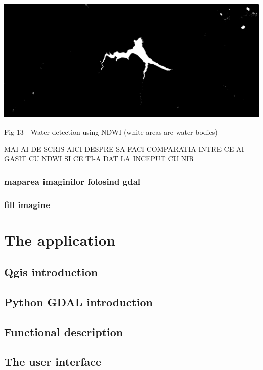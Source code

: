 \documentclass[12pt, a4paper]{report}
\begin{document}
\includegraphics[scale=0.35, left]{NDWI-prediction.png}
\begin{center}
Fig 13 - Water detection using NDWI (white areas are water bodies)
\end{center}


\par 

\bigskip


MAI AI DE SCRIS AICI DESPRE SA FACI COMPARATIA INTRE CE AI GASIT CU NDWI SI CE TI-A DAT LA INCEPUT CU NIR




\subsection{maparea imaginilor folosind gdal}
\subsection{fill imagine}




\chapter{The application}

\section{Qgis introduction} 


\section{Python GDAL introduction} 

\section{Functional description} 


\section{The user interface}
\end{document}
